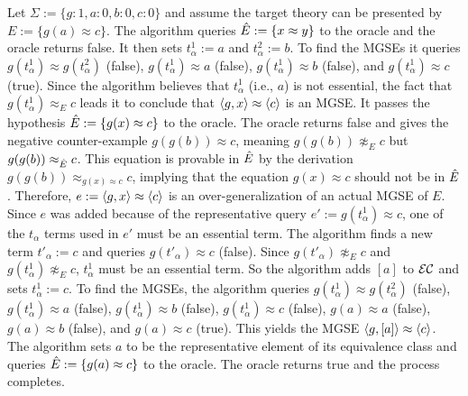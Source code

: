 \begin{example}
Let $\Sigma := \{ g:1, a:0, b:0, c:0 \}$ and assume the target theory can be presented by $E := \{ g(a) \approx c\}$. 
The algorithm queries $\ahat{E}  := \{ x \approx y \}$ to the oracle and the oracle returns false.
It then sets $t^1_\alpha := a$ and $t^2_\alpha := b$.
To find the MGSEs it queries $g(t^1_\alpha) \approx g(t^2_\alpha)$ (false), $g(t^1_\alpha) \approx a$ (false), $g(t^1_\alpha) \approx b$ (false), and $g(t^1_\alpha) \approx c$ (true).
Since the algorithm believes that $t^1_\alpha$ (i.e., $a$) is not essential, the fact that $g(t^1_\alpha) \approx_E c$ leads it to conclude that $\langle g,x \rangle \approx \langle c \rangle$ is an MGSE. 
It passes the hypothesis $\ahat{E}  := \{ g(x) \approx c\}$ to the oracle. 
The oracle returns false and gives the negative counter-example $g(g(b))\approx c$, meaning $g(g(b))\not\approx_E c$ but $g(g(b))\approx_{\ahat{E}} c$.
This equation is provable in $\ahat{E}$ by the derivation $g(g(b)) \approx_{g(x)\approx c} c$, implying that the equation $g(x) \approx c$ should not be in $\ahat{E}$.
Therefore, $e := \langle g, x \rangle \approx \langle c \rangle$ is an over-generalization of an actual MGSE of $E$. 
Since $e$ was added because of the representative query $e' := g(t^1_\alpha) \approx c$, one of the $t_\alpha$ terms used in $e'$ must be an essential term.
The algorithm finds a new term $t'_\alpha := c$ and queries $g(t'_\alpha) \approx c$ (false).
Since $g(t'_\alpha) \not\approx_E c$ and $g(t^1_\alpha) \not\approx_E c$, $t^1_\alpha$ must be an essential term. 
So the algorithm adds $[a]$  to ${\mathcal{E}\mathcal{C}}$ and sets $t^1_\alpha := c$.
To find the MGSEs, the algorithm queries $g(t^1_\alpha) \approx g(t^2_\alpha)$ (false), $g(t^1_\alpha) \approx a$ (false), $g(t^1_\alpha) \approx b$ (false), $g(t^1_\alpha) \approx c$ (false), $g(a) \approx a$ (false), $g(a) \approx b$ (false), and $g(a) \approx c$ (true). 
This yields the MGSE $\langle g, [a] \rangle \approx \langle c \rangle$.
The algorithm sets $a$ to be the representative element of its equivalence class and queries $\ahat{E} := \{ g(a) \approx c \}$ to the oracle.
The oracle returns true and the process completes. 
\end{example}
